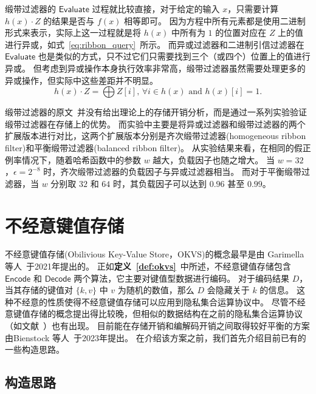 缎带过滤器的 $\mathsf{Evaluate}$ 过程就比较直接，对于给定的输入 $x$，只需要计算 $h(x)\cdot Z$ 的结果是否与 $f(x)$ 相等即可。
因为方程中所有元素都是使用二进制形式来表示，实际上这一过程就是将 $h(x)$ 中所有为 $1$ 的位置对应在 $Z$ 上的值进行异或，如式~\ref{eq:ribbon_query}~所示。
而异或过滤器和二进制引信过滤器在 $\mathsf{Evaluate}$ 也是类似的方式，只不过它们只需要找到三个（或四个）位置上的值进行异或。
但考虑到异或操作本身执行效率非常高，缎带过滤器虽然需要处理更多的异或操作，但实际中这些差距并不明显。
\begin{equation}
  h(x) \cdot Z = \bigoplus Z[i] \mbox{, } \forall i \in h(x) \mbox{ and } h(x)[i] = 1.
  \label{eq:ribbon_query}
\end{equation}

缎带过滤器的原文~\cite{dillinger2021ribbon}并没有给出理论上的存储开销分析，而是通过一系列实验验证缎带过滤器在存储上的优势。
而实验中主要是将异或过滤器和缎带过滤器的两个扩展版本进行对比，这两个扩展版本分别是齐次缎带过滤器(homogeneous ribbon filter)和平衡缎带过滤器(balanced ribbon filter)。
从实验结果来看，在相同的假正例率情况下，随着哈希函数中的参数 $w$ 越大，负载因子也随之增大。
当 $w=32$，$\epsilon=2^{-8}$ 时，齐次缎带过滤器的负载因子与异或过滤器相当。
而对于平衡缎带过滤器，当 $w$ 分别取 $32$ 和 $64$ 时，其负载因子可以达到 $0.96$ 甚至 $0.99$。

\section{不经意键值存储}

不经意键值存储(Obilivious Key-Value Store，OKVS)的概念最早是由 Garimella 等人~\cite{garimella2021oblivious}于2021年提出的。
正如\textbf{定义~\ref{def:okvs}}~中所述，不经意键值存储包含 $\mathsf{Encode}$ 和 $\mathsf{Decode}$ 两个算法，它主要对键值型数据进行编码。
对于编码结果 $D$，当其存储的键值对 $\{k, v\}$ 中 $v$ 为随机的数值，那么 $D$ 会隐藏关于 $k$ 的信息。
这种不经意的性质使得不经意键值存储可以应用到隐私集合运算协议中。
尽管不经意键值存储的概念提出得比较晚，但相似的数据结构在之前的隐私集合运算协议（如文献~\cite{dong2013when,pinkas2020psi}）也有出现。
目前能在存储开销和编解码开销之间取得较好平衡的方案由Bienstock 等人~\cite{bienstock2023NearOptimal}于2023年提出。
在介绍该方案之前，我们首先介绍目前已有的一些构造思路。

\subsection{构造思路}

